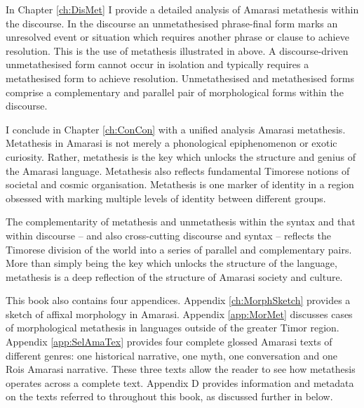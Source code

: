 In Chapter \ref{ch:DisMet} I provide a detailed analysis of Amarasi metathesis within the discourse.
In the discourse an unmetathesised phrase-final form marks an unresolved event or situation
which requires another phrase or clause to achieve resolution.
This is the use of metathesis illustrated in  above.
A discourse-driven unmetathesised form cannot occur in isolation
and typically requires a metathesised form to achieve resolution.
Unmetathesised and metathesised forms comprise a complementary and
parallel pair of morphological forms within the discourse.

I conclude in Chapter \ref{ch:ConCon} with a unified analysis Amarasi metathesis.
Metathesis in Amarasi is not merely a phonological epiphenomenon or exotic curiosity.
Rather, metathesis is the key which unlocks the structure and genius of the Amarasi language.
Metathesis also reflects fundamental Timorese notions of societal and cosmic organisation.
Metathesis is one marker of identity in a region obsessed with marking multiple
levels of identity between different groups.

The complementarity of metathesis and unmetathesis within the syntax and that within discourse
-- and also cross-cutting discourse and syntax --
reflects the Timorese division of the world into a series of parallel and complementary pairs.
More than simply being the key which unlocks the structure of the language,
metathesis is a deep reflection of the structure of Amarasi society and culture.

This book also contains four appendices.
Appendix \ref{ch:MorphSketch} provides a sketch of affixal morphology in Amarasi.
Appendix \ref{app:MorMet} discusses cases of morphological metathesis
in languages outside of the greater Timor region.
Appendix \ref{app:SelAmaTex} provides four complete
glossed Amarasi texts of different genres:
one historical narrative, one myth, one conversation
and one Ro{\Q}is Amarasi narrative.
These three texts allow the reader to see
how metathesis operates across a complete text.
Appendix D
provides information and metadata
on the texts referred to throughout this book,
as discussed further in  below.







